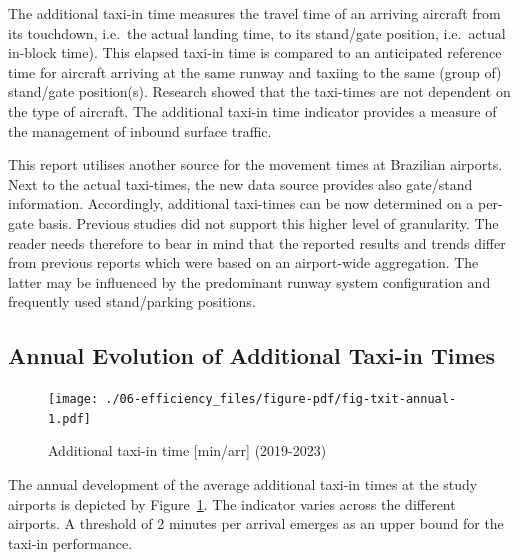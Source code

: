 \documentclass[
  a4paper,
  DIV=11,
  numbers=noendperiod]{scrreport}
\begin{document}
The additional taxi-in time measures the travel time of an arriving
aircraft from its touchdown, i.e.~the actual landing time, to its
stand/gate position, i.e.~actual in-block time). This elapsed taxi-in
time is compared to an anticipated reference time for aircraft arriving
at the same runway and taxiing to the same (group of) stand/gate
position(s). Research showed that the taxi-times are not dependent on
the type of aircraft. The additional taxi-in time indicator provides a
measure of the management of inbound surface traffic.

This report utilises another source for the movement times at Brazilian
airports. Next to the actual taxi-times, the new data source provides
also gate/stand information. Accordingly, additional taxi-times can be
now determined on a per-gate basis. Previous studies did not support
this higher level of granularity. The reader needs therefore to bear in
mind that the reported results and trends differ from previous reports
which were based on an airport-wide aggregation. The latter may be
influenced by the predominant runway system configuration and frequently
used stand/parking positions.

\hypertarget{annual-evolution-of-additional-taxi-in-times}{%
\subsection{Annual Evolution of Additional Taxi-in
Times}\label{annual-evolution-of-additional-taxi-in-times}}

\begin{figure}[H]

{\centering \texttt{[image: ./06-efficiency\_files/figure-pdf/fig-txit-annual-1.pdf]}

}

\caption{\label{fig-txit-annual}Additional taxi-in time {[}min/arr{]}
(2019-2023)}

\end{figure}

The annual development of the average additional taxi-in times at the
study airports is depicted by Figure~\ref{fig-txit-annual}. The
indicator varies across the different airports. A threshold of 2 minutes
per arrival emerges as an upper bound for the taxi-in performance.
\end{document}

